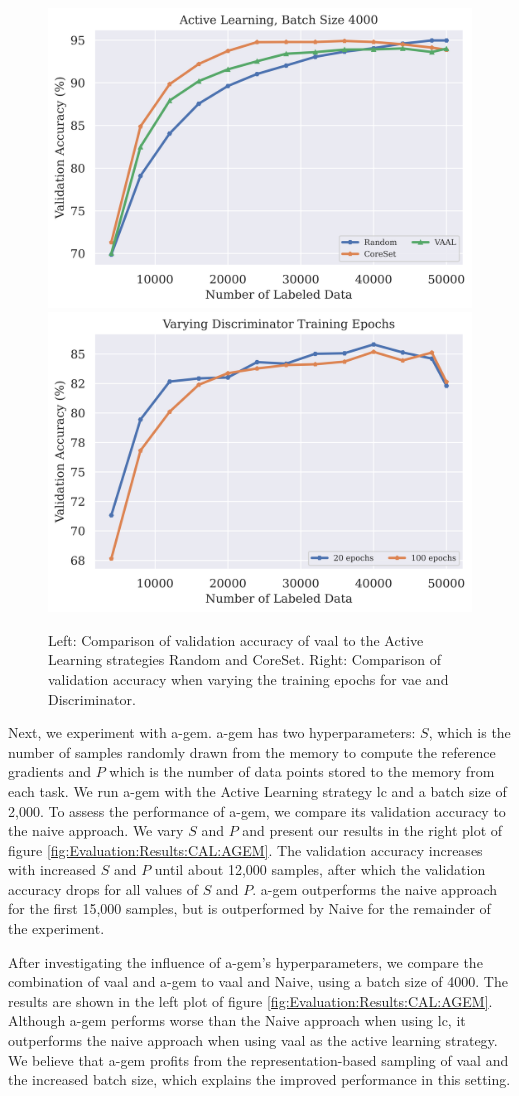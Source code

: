 \begin{figure}[h]
    \centering
    \includegraphics[width=0.46\linewidth]{images/results_CAL/vaal_al.png} \hfill
    \includegraphics[width=0.46\linewidth]{images/results_CAL/vaal_disc_epochs.png}
    \caption[Continual Active Learning Custom Replay strategy]{Left: Comparison of validation accuracy of \gls{vaal} to the Active Learning strategies Random and CoreSet.
    Right: Comparison of validation accuracy when varying the training epochs for \gls{vae} and Discriminator.}
    \label{fig:Evaluation:Results:CAL:VAAL}
\end{figure}

Next, we experiment with \gls{a-gem}. \gls{a-gem} has two hyperparameters: $S$, which is the number of samples randomly drawn from the memory to compute the reference
gradients and $P$ which is the number of data points stored to the memory from each task. We run \gls{a-gem} with the Active Learning strategy \gls{lc} and a batch size
of 2,000. To assess the performance of \gls{a-gem}, we compare its validation accuracy to the naive approach. We vary $S$ and $P$ and present our results in the right plot
of figure \ref{fig:Evaluation:Results:CAL:AGEM}. The validation accuracy increases with increased $S$ and $P$ until about 12,000 samples, after which the validation 
accuracy drops for all values of $S$ and $P$. \gls{a-gem} outperforms the naive approach for the first 15,000 samples, but is outperformed by Naive for the remainder of
the experiment. \par
After investigating the influence of \gls{a-gem}'s hyperparameters, we compare the combination of \gls{vaal} and \gls{a-gem} to \gls{vaal} and Naive, using a batch size
of 4000. The results are shown in the left plot of figure \ref{fig:Evaluation:Results:CAL:AGEM}. Although \gls{a-gem} performs worse than the Naive
approach when using \gls{lc}, it outperforms the naive approach when using \gls{vaal} as the active learning strategy. We believe that \gls{a-gem} profits from the 
representation-based sampling of \gls{vaal} and the increased batch size, which explains the improved performance in this setting. \par

